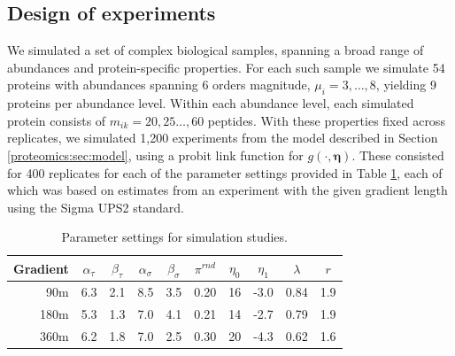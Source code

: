
\subsection{Design of experiments}
\label{proteomics:sec:doe}

We simulated a set of complex biological samples, spanning a broad range of abundances and protein-specific properties.
For each such sample we simulate 54 proteins with abundances spanning 6 orders magnitude, $\mu_i= 3, \ldots, 8$, yielding 9 proteins per abundance level.
Within each abundance level, each simulated protein consists of $m_{ik}=20,25\ldots,60$ peptides.
With these properties fixed across replicates, we simulated 1,200 experiments from the model described in Section \ref{proteomics:sec:model}, using a probit link function for $g(\cdot, \bm \eta)$.
These consisted for 400 replicates for each of the parameter settings provided in Table \ref{proteomics:table:sim_parameters}, each of which was based on estimates from an experiment with the given gradient length using the Sigma UPS2 standard.

\begin{table}
\begin{center}
\caption{Parameter settings for simulation studies.
\label{proteomics:table:sim_parameters}}
\begin{tabular}{r|ccccccccc}
  \hline
Gradient & $\alpha_\tau$ & $\beta_\tau$ & $\alpha_\sigma$ & $\beta_\sigma$ & $\pi^{rnd}$ & $\eta_0$ & $\eta_1$ & $\lambda$ & $r$ \\ 
  \hline
   90m & 6.3 & 2.1 & 8.5 & 3.5 & 0.20 & 16 & -3.0 & 0.84 & 1.9 \\ 
  180m & 5.3 & 1.3 & 7.0 & 4.1 & 0.21 & 14 & -2.7 & 0.79 & 1.9 \\ 
  360m & 6.2 & 1.8 & 7.0 & 2.5 & 0.30 & 20 & -4.3 & 0.62 & 1.6 \\ 
   \hline
\end{tabular}
\end{center}
\end{table}





